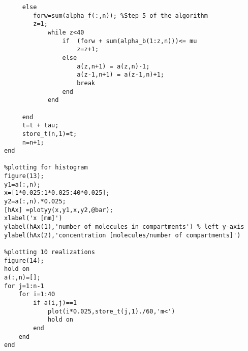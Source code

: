 \documentclass[10 pt]{article}
\begin{document}
\begin{multicols}{2}
\begin{flushleft}
\begin{lstlisting}
     else
     	forw=sum(alpha_f(:,n)); %Step 5 of the algorithm
        z=1;
        	while z<40 
            	if  (forw + sum(alpha_b(1:z,n)))<= mu                                                     
                	z=z+1;
                else
                	a(z,n+1) = a(z,n)-1;
                    a(z-1,n+1) = a(z-1,n)+1;
                    break
                end
            end  
                                                     
     end                            
     t=t + tau;
     store_t(n,1)=t;
     n=n+1;      
end

%plotting for histogram
figure(13);
y1=a(:,n);
x=[1*0.025:1*0.025:40*0.025];
y2=a(:,n).*0.025;
[hAx] =plotyy(x,y1,x,y2,@bar);
xlabel('x [mm]')
ylabel(hAx(1),'number of molecules in compartments') % left y-axis
ylabel(hAx(2),'concentration [molecules/number of compartments]') 

%plotting 10 realizations
figure(14);
hold on
a(:,n)=[];
for j=1:n-1
    for i=1:40
        if a(i,j)==1
            plot(i*0.025,store_t(j,1)./60,'m<')
            hold on
        end
    end
end

\end{lstlisting}
\end{flushleft}
\end{multicols}
\end{document}
